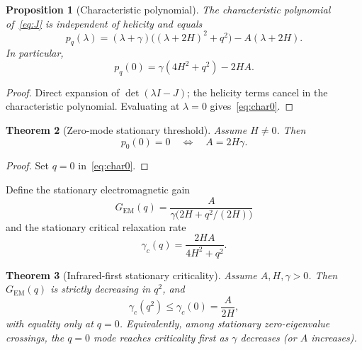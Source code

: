 \documentclass[11pt]{article}
\newtheorem{theorem}{Theorem}[section]
\newtheorem{proposition}[theorem]{Proposition}
\theoremstyle{definition}
\theoremstyle{remark}
\begin{document}
\begin{proposition}[Characteristic polynomial]
\label{prop:char}
The characteristic polynomial of~\eqref{eq:J} is independent of helicity and equals
\begin{equation}
\label{eq:char}
p_q(\lambda)=(\lambda+\gamma)\bigl((\lambda+2H)^2+q^2\bigr)-A(\lambda+2H).
\end{equation}
In particular,
\begin{equation}
\label{eq:char0}
p_q(0)=\gamma(4H^2+q^2)-2HA.
\end{equation}
\end{proposition}

\begin{proof}
Direct expansion of $\det(\lambda I-J)$; the helicity terms cancel in the characteristic
polynomial.
Evaluating at $\lambda=0$ gives~\eqref{eq:char0}.
\end{proof}

\begin{theorem}[Zero-mode stationary threshold]
\label{thm:zero-mode}
Assume $H\neq0$.
Then
\begin{equation}
\label{eq:threshold}
p_0(0)=0\quad\Longleftrightarrow\quad A=2H\gamma.
\end{equation}
\end{theorem}

\begin{proof}
Set $q=0$ in~\eqref{eq:char0}.
\end{proof}

Define the stationary electromagnetic gain
\begin{equation}
\label{eq:GEM}
G_{\mathrm{EM}}(q)=\frac{A}{\gamma\bigl(2H+q^2/(2H)\bigr)}
\end{equation}
and the stationary critical relaxation rate
\begin{equation}
\label{eq:gammac}
\gamma_c(q)=\frac{2HA}{4H^2+q^2}.
\end{equation}

\begin{theorem}[Infrared-first stationary criticality]
\label{thm:IR-first}
Assume $A,H,\gamma>0$.
Then $G_{\mathrm{EM}}(q)$ is strictly decreasing in $q^2$, and
\begin{equation}
\gamma_c(q^2)\le\gamma_c(0)=\frac{A}{2H},
\end{equation}
with equality only at $q=0$.
Equivalently, among stationary zero-eigenvalue crossings, the $q=0$ mode reaches criticality
first as $\gamma$ decreases (or $A$ increases).
\end{theorem}
\end{document}
